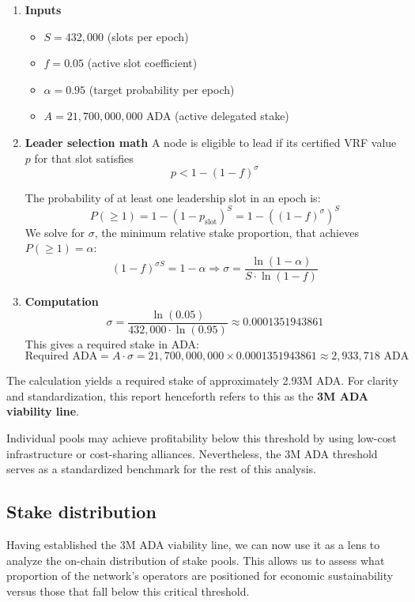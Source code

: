 \documentclass[11pt, letterpaper]{article}
\begin{document}
\begin{enumerate}
	\item \textbf{Inputs}
	      \begin{itemize}
		      \item $S=432,000$ (slots per epoch)
		      \item $f=0.05$ (active slot coefficient)
		      \item $\alpha=0.95$ (target probability per epoch)
		      \item $A=21,700,000,000$ ADA (active delegated stake)
	      \end{itemize}
	\item \textbf{Leader selection math} A node is eligible to lead if its certified VRF value $p$ for that
	      slot satisfies
	      \[ p < 1 - {(1-f)}^{\sigma} \]

	      The probability of at least one leadership slot in an epoch is:
	      \[ P(\ge1)=1-(1-p_{\text{slot}})^{S}=1-((1-f)^{\sigma})^{S} \]
	      We solve for $\sigma$, the minimum relative stake proportion, that achieves
	      $P(\ge1)=\alpha$:
	      \[ (1-f)^{\sigma S}=1-\alpha\Rightarrow\sigma=\frac{\ln(1-\alpha)}{S\cdot \ln(1-f)} \]
	\item \textbf{Computation}
	      \[ \sigma=\frac{\ln(0.05)}{432,000\cdot \ln(0.95)}\approx0.0001351943861 \]
	      This gives a required stake in ADA\@:
	      \[ \text{Required ADA}=A\cdot\sigma=21,700,000,000\times0.0001351943861\approx2,933,718 \text{ ADA} \]
\end{enumerate}

The calculation yields a required stake of approximately 2.93M ADA\@. For clarity
and standardization, this report henceforth refers to this as the \textbf{3M
	ADA viability line}.

Individual pools may achieve profitability below this threshold by using low-cost
infrastructure or cost-sharing alliances. Nevertheless, the 3M ADA threshold serves
as a standardized benchmark for the rest of this analysis.

\subsection{Stake distribution}

Having established the 3M ADA viability line, we can now use it as a lens to
analyze the on-chain distribution of stake pools. This allows us to assess what
proportion of the network's operators are positioned for economic
sustainability versus those that fall below this critical threshold.
\end{document}
